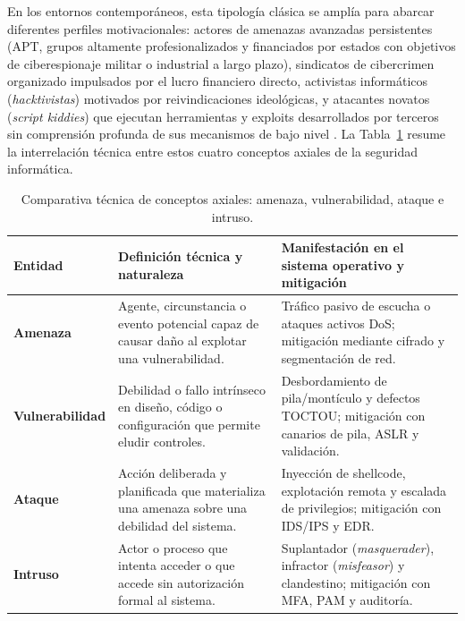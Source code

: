 \documentclass[12pt]{article}
\begin{document}
En los entornos contemporáneos, esta tipología clásica se amplía para abarcar diferentes perfiles motivacionales: actores de amenazas avanzadas persistentes (APT, grupos altamente profesionalizados y financiados por estados con objetivos de ciberespionaje militar o industrial a largo plazo), sindicatos de cibercrimen organizado impulsados por el lucro financiero directo, activistas informáticos (\textit{hacktivistas}) motivados por reivindicaciones ideológicas, y atacantes novatos (\textit{script kiddies}) que ejecutan herramientas y exploits desarrollados por terceros sin comprensión profunda de sus mecanismos de bajo nivel \parencite[\S 19.5.5, p.\ 948]{deitel2004operating}. La Tabla~\ref{tab:comparativaAmenazaVulnerabilidadAtaqueIntruso} resume la interrelación técnica entre estos cuatro conceptos axiales de la seguridad informática.

\begin{table}[htbp]
\centering
\footnotesize
\renewcommand{\arraystretch}{1.1}
\renewcommand{\tabularxcolumn}[1]{m{#1}}
\setlength{\emergencystretch}{1.5em}
\caption{Comparativa técnica de conceptos axiales: amenaza, vulnerabilidad, ataque e intruso.}
\label{tab:comparativaAmenazaVulnerabilidadAtaqueIntruso}
\begin{tabularx}{\textwidth}{>{\centering\arraybackslash}m{2.3cm} X X}
\toprule
\textbf{Entidad} & \textbf{Definición técnica y naturaleza} & \textbf{Manifestación en el sistema operativo y mitigación} \\
\midrule
\textbf{Amenaza} & Agente, circunstancia o evento potencial capaz de causar daño al explotar una vulnerabilidad. & Tráfico pasivo de escucha o ataques activos DoS; mitigación mediante cifrado y segmentación de red. \\
\addlinespace
\textbf{Vulnerabilidad} & Debilidad o fallo intrínseco en diseño, código o configuración que permite eludir controles. & Desbordamiento de pila/montículo y defectos TOCTOU; mitigación con canarios de pila, ASLR y validación. \\
\addlinespace
\textbf{Ataque} & Acción deliberada y planificada que materializa una amenaza sobre una debilidad del sistema. & Inyección de shellcode, explotación remota y escalada de privilegios; mitigación con IDS/IPS y EDR. \\
\addlinespace
\textbf{Intruso} & Actor o proceso que intenta acceder o que accede sin autorización formal al sistema. & Suplantador (\textit{masquerader}), infractor (\textit{misfeasor}) y clandestino; mitigación con MFA, PAM y auditoría. \\
\bottomrule
\end{tabularx}
\end{table}
\end{document}
